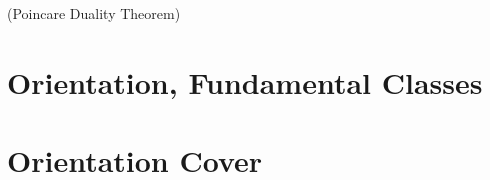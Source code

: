 \documentclass[Total.tex]{subfiles}
\begin{document}
			\begin{theorem}
				(Poincare Duality Theorem)
			\end{theorem}
			
		\section{Orientation, Fundamental Classes}
		\section{Orientation Cover}
\end{document}
